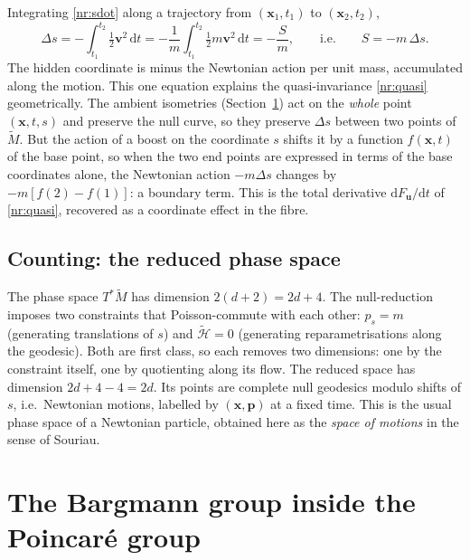 Integrating \eqref{nr:sdot} along a trajectory from $(\mathbf{x}_1,t_1)$ to
$(\mathbf{x}_2,t_2)$,
\begin{equation}
  \Delta s=-\int_{t_1}^{t_2}\tfrac12\mathbf{v}^2\,\mathrm{d}t
  =-\frac1m\int_{t_1}^{t_2}\tfrac12 m\mathbf{v}^2\,\mathrm{d}t
  =-\frac{S}{m},
  \qquad\text{i.e.}\qquad S=-m\,\Delta s .
  \label{nr:action}
\end{equation}
The hidden coordinate is minus the Newtonian action per unit mass, accumulated
along the motion. This one equation explains the quasi-invariance \eqref{nr:quasi}
geometrically. The ambient isometries (Section~\ref{sec:nr-symmetry}) act on the
\emph{whole} point $(\mathbf{x},t,s)$ and preserve the null curve, so they
preserve $\Delta s$ between two points of $\tilde M$. But the action of a boost
on the coordinate $s$ shifts it by a function $f(\mathbf{x},t)$ of the base
point, so when the two end points are expressed in terms of the base coordinates
alone, the Newtonian action $-m\Delta s$ changes by $-m[f(2)-f(1)]$: a boundary
term. This is the total derivative $\mathrm{d}F_{\mathbf u}/\mathrm{d}t$ of
\eqref{nr:quasi}, recovered as a coordinate effect in the fibre.

\subsection{Counting: the reduced phase space}

The phase space $T^*\tilde M$ has dimension $2(d+2)=2d+4$. The null-reduction
imposes two constraints that Poisson-commute with each other:
$p_s=m$ (generating translations of $s$) and $\tilde{\mathcal{H}}=0$
(generating reparametrisations along the geodesic). Both are first class, so
each removes two dimensions: one by the constraint itself, one by quotienting
along its flow. The reduced space has dimension $2d+4-4=2d$. Its points are
complete null geodesics modulo shifts of $s$, i.e.\ Newtonian motions, labelled
by $(\mathbf{x},\mathbf{p})$ at a fixed time. This is the usual phase space of a
Newtonian particle, obtained here as the \emph{space of motions} in the sense of
Souriau.

\section[The Bargmann group in the Poincar\'e group]{The Bargmann group inside the Poincar\'e group}
\label{sec:nr-symmetry}

